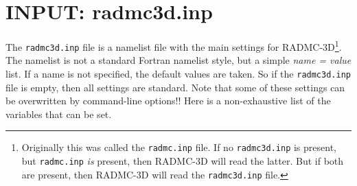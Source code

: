 \documentclass{report}
\begin{document}
\section{INPUT: radmc3d.inp}
\label{sec-radmc-inp}
The {\small\tt radmc3d.inp} file is a namelist file with the main settings
for RADMC-3D\footnote{Originally this was called the {\small\tt radmc.inp}
  file. If no {\small\tt radmc3d.inp} is present, but {\small\tt radmc.inp}
  {\em is} present, then RADMC-3D will read the latter. But if both are
  present, then RADMC-3D will read the {\small\tt radmc3d.inp} file.}. The
namelist is not a standard Fortran namelist style, but a simple {\em name =
  value} list. If a name is not specified, the default values are taken.  So
if the {\small\tt radmc3d.inp} file is empty, then all settings are
standard.  Note that some of these settings can be overwritten by
command-line options!!  Here is a non-exhaustive list of the variables that
can be set.
\end{document}
